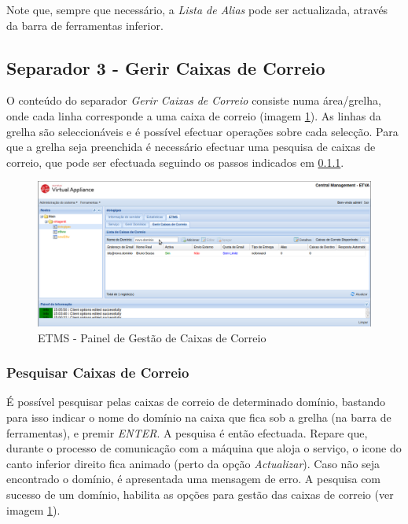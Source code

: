 Note que, sempre que necessário, a \textit{Lista de Alias} pode ser actualizada, através da barra de ferramentas inferior.

\subsection{Separador 3 - Gerir Caixas de Correio}
\label{sec:etms_caixas_correio}
O conteúdo do separador \textit{Gerir Caixas de Correio} consiste numa área/grelha, onde cada linha corresponde a uma caixa de correio (imagem \ref{fig:etms_gerir_mailboxes_mb}). As linhas da grelha são seleccionáveis e é possível efectuar operações sobre cada selecção. Para que a grelha seja preenchida é necessário efectuar uma pesquisa de caixas de correio, que pode ser efectuada seguindo os passos indicados em \ref{sec:etms_sub_pesquisar_caixas_correio}.

\begin{figure}[H]
    \begin{center}
    \includegraphics[scale=0.35]{screenshots/etms/etms_gerir_mailboxes.png}
    \caption{ETMS - Painel de Gestão de Caixas de Correio}
    \label{fig:etms_gerir_mailboxes_mb}
    \end{center}
\end{figure}


\subsubsection{Pesquisar Caixas de Correio}
\label{sec:etms_sub_pesquisar_caixas_correio}
É possível pesquisar pelas caixas de correio de determinado domínio, bastando para isso indicar o nome do domínio na caixa que fica sob a grelha (na barra de ferramentas), e premir \textit{ENTER}. A pesquisa é então efectuada. Repare que, durante o processo de comunicação com a máquina que aloja o serviço, o icone do canto inferior direito fica animado (perto da opção \textit{Actualizar}). Caso não seja encontrado o domínio, é apresentada uma mensagem de erro. A pesquisa com sucesso de um domínio, habilita as opções para gestão das caixas de correio (ver imagem \ref{fig:etms_gerir_mailboxes_mb}).

